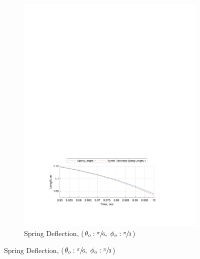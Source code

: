 \documentclass[12pt]{report}
\begin{document}
\begin{flushleft}
\begin{figure}[!htp]
\begin{subfigure}{\textwidth}
    \includegraphics[center]{4}
    \caption*{Spring Deflection, ($\theta_o:\sfrac{\pi}{6},~\phi_o:\sfrac{\pi}{3}$)}
  \end{subfigure}
\end{figure}
\begin{figure}[!htp] \ContinuedFloat
  \begin{subfigure}{\textwidth}

\end{subfigure}
\end{figure}
\end{flushleft}
\end{document}
